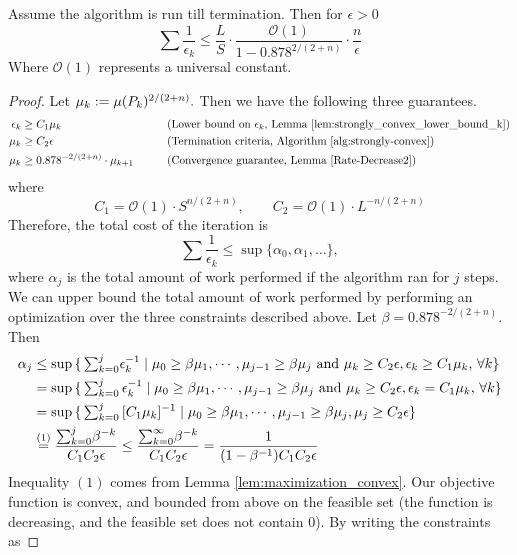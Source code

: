 \begin{thm}
Assume the algorithm is run till termination. Then for $\epsilon>0$
\[
\sum\frac{1}{\epsilon_k}\leq\frac{L}{S}\cdot\frac{\mathcal{O}(1)}{1-0.878^{2/(2+n)}}\cdot\frac{n}{\epsilon}
\]
Where $\mathcal{O}(1)$ represents a universal constant.
\end{thm}
\begin{proof}
Let $\mu_k:=\mu(P_k)^{2/(2+n)}.$ Then we have the following three
guarantees. 
\begin{alignat*}{2}
  \epsilon_k & \geq C_1\mu_k &  & \mbox{(Lower bound on $\epsilon_k$, Lemma \ref{lem:strongly_convex_lower_bound_k})}\\
  \mu_k & \geq C_2\epsilon & \qquad & \mbox{(Termination criteria, Algorithm \ref{alg:strongly-convex})}\\
  \mu_k & \geq0.878^{-2/(2+n)}\cdot\mu_{k+1} &  & \mbox{(Convergence guarantee, Lemma \ref{Rate-Decrease2})}
\end{alignat*}
where
\[
C_1=\mathcal{O}(1)\cdot S^{n/(2+n)},\qquad C_2=\mathcal{O}(1)\cdot L^{-n/(2+n)}
\]
Therefore, the total cost of the iteration is 
\[
\sum\frac{1}{\epsilon_k}\leq\sup\{\alpha_0,\alpha_1,\dots\},
\]
where $\alpha_j$ is the total amount of work performed if the algorithm
ran for $j$ steps. We can upper bound the total amount of work performed 
by performing an optimization over the three constraints described above.
Let $\beta=0.878^{-2/(2+n)}.$ Then 
\begin{align*}
\alpha_{j} 
  & \leq \sup\,\{\,{\textstyle \sum_{k=0}^j}\epsilon_k^{-1}\mid\mu_0\geq\beta\mu_1,\cdots,\mu_{j-1}\geq\beta\mu_{j}\mbox{ and }\mu_k\geq C_2\epsilon,\epsilon_k\geq C_1\mu_k\mbox{, $\forall k$}\}\\
  & =\sup\,\{\,{\textstyle \sum_{k=0}^j}\,\epsilon_k^{-1}\mid\mu_0\geq\beta\mu_1,\cdots,\mu_{j-1}\geq\beta\mu_{j}\mbox{ and }\mu_k\geq C_2\epsilon,\epsilon_k=C_1\mu_k\mbox{, $\forall k$}\}\\
  & =\sup\,\{\,{\textstyle \sum_{k=0}^j}\,[C_1\mu_k]^{-1}\mid\mu_0\geq\beta\mu_1,\cdots,\mu_{j-1}\geq\beta\mu_{j},\mu_j\geq C_2\epsilon\}\\
  & \overset{(1)}{=}\frac{{\textstyle \sum_{k=0}^j}\beta^{-k}}{C_1C_2\epsilon}
  \leq \frac{{\textstyle \sum_{k=0}^{\infty}}\beta^{-k} } { C_1C_2\epsilon}
  =\frac{1}{( 1-{\beta^{-1}} )C_1C_2\epsilon } 
\end{align*}
Inequality $(1)$ comes from Lemma \ref{lem:maximization_convex}. Our objective function
is convex, and bounded from above on the feasible set (the function is decreasing, and the feasible set does not contain $0$). By writing the constraints as

\end{proof}
